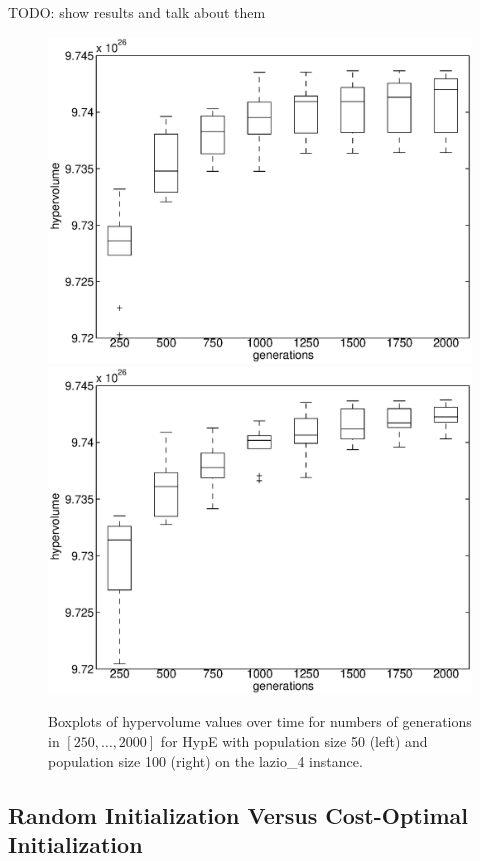 \documentclass[preprint,12pt]{elsarticle}
\newcommand{\TODO}[1]{{\color{red}TODO: #1}}
\begin{document}
\TODO{show results and talk about them}



\begin{figure}
	\centering
	\includegraphics[width=0.48\columnwidth]{../experiments/randVsCost/hypervolumes/hypervolumeOverTime_50.eps}%
	\includegraphics[width=0.48\columnwidth]{../experiments/randVsCost/hypervolumes/hypervolumeOverTime_100.eps}%
	\caption{\label{fig:hypervolumeOverTime} Boxplots of hypervolume values over time for numbers of generations in $[250, \ldots, 2000]$ for HypE with population size 50 (left) and population size 100 (right) on the lazio\_4 instance.}
\end{figure}


\subsection{Random Initialization Versus Cost-Optimal Initialization}
\end{document}
